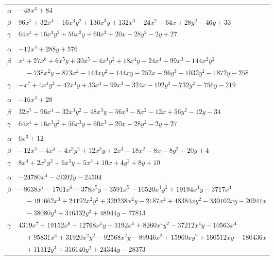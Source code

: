 \documentclass[11pt]{article}
\begin{document}
\begin{longtable}{@{}ll@{}}
$\alpha$ & $-48x^{3}+84$\\
$\beta$ & $96x^{5}+32x^{4}-16x^{3}y^{2}+136x^{3}y+132x^{3}-24x^{2}+64x+28y^{2}-46y+33$\\
$\gamma$ & $64x^{4}+16x^{3}y^{2}+56x^{3}y+60x^{3}+20x-28y^{2}-2y+27$\\
\addlinespace[3pt]
\multicolumn{2}{@{}l}{$\{i,j\}=\{13,23\}$, $k_{ij}=2^{2}\cdot 3^{5}$}\\
$\alpha$ & $-12x^{4}+288y+576$\\
$\beta$ & $x^{7}+27x^{6}+6x^{5}y+30x^{5}-4x^{4}y^{2}+18x^{4}y+24x^{4}+99x^{3}-144x^{2}y^{2}$\\
 & $\quad -738x^{2}y-873x^{2}-144xy^{2}-144xy-252x-96y^{3}-1032y^{2}-1872y-258$\\
$\gamma$ & $-x^{7}+4x^{4}y^{2}+42x^{4}y+33x^{4}-99x^{3}-324x-192y^{3}-732y^{2}-756y-219$\\
\addlinespace[3pt]
\multicolumn{2}{@{}l}{$\{i,j\}=\{13,25\}$, $k_{ij}=3^{2}\cdot 7$}\\
$\alpha$ & $-16x^{3}+28$\\
$\beta$ & $32x^{5}-96x^{4}-32x^{3}y^{2}-48x^{3}y-56x^{3}-8x^{2}-12x+56y^{2}-12y-34$\\
$\gamma$ & $64x^{4}+16x^{3}y^{2}+56x^{3}y+60x^{3}+20x-28y^{2}-2y+27$\\
\addlinespace[3pt]
\multicolumn{2}{@{}l}{$\{i,j\}=\{14,28\}$, $k_{ij}=2^{2}\cdot 3$}\\
$\alpha$ & $6x^{3}+12$\\
$\beta$ & $-12x^{5}-4x^{4}-4x^{3}y^{2}+12x^{3}y+2x^{3}-18x^{2}-8x-8y^{2}+20y+4$\\
$\gamma$ & $8x^{4}+2x^{3}y^{2}+6x^{3}y+5x^{3}+10x+4y^{2}+8y+10$\\
\addlinespace[3pt]
\multicolumn{2}{@{}l}{$\{i,j\}=\{15,33\}$, $k_{ij}=2^{4}\cdot 3^{3}$}\\
$\alpha$ & $-24780x^{4}-49392y-24504$\\
$\beta$ & $-8638x^{7}-1701x^{6}-378x^{5}y-3591x^{5}-16520x^{4}y^{2}+19194x^{4}y-3717x^{4}$\\
 & $\quad -191662x^{3}+24192x^{2}y^{2}+329238x^{2}y-2187x^{2}+48384xy^{2}-330102xy-20941x$\\
 & $\quad -38080y^{3}+316332y^{2}+48944y-77813$\\
$\gamma$ & $4319x^{7}+19152x^{6}-12768x^{5}y+3192x^{5}+8260x^{4}y^{2}-37212x^{4}y-10563x^{4}$\\
 & $\quad +95831x^{3}+31920x^{2}y^{2}-92568x^{2}y-89946x^{2}+15960xy^{2}+160512xy-180436x$\\
 & $\quad +11312y^{3}+316140y^{2}+24344y-28373$\\

\end{longtable}
\end{document}
